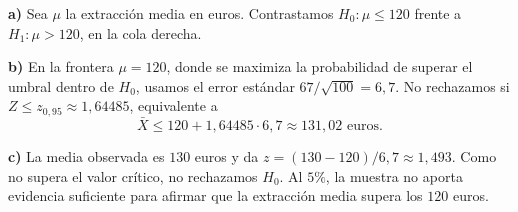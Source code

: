 \textbf{a)} Sea $\mu$ la extracción media en euros. Contrastamos $H_0:\mu\le120$ frente a $H_1:\mu>120$, en la cola derecha.

\textbf{b)} En la frontera $\mu=120$, donde se maximiza la probabilidad de superar el umbral dentro de $H_0$, usamos el error estándar $67/\sqrt{100}=6{,}7$. No rechazamos si $Z\le z_{0{,}95}\approx1{,}64485$, equivalente a
\[
\bar X\le120+1{,}64485\cdot6{,}7\approx131{,}02\text{ euros}.
\]

\textbf{c)} La media observada es $130$ euros y da $z=(130-120)/6{,}7\approx1{,}493$. Como no supera el valor crítico, no rechazamos $H_0$. Al $5\%$, la muestra no aporta evidencia suficiente para afirmar que la extracción media supera los $120$ euros.
